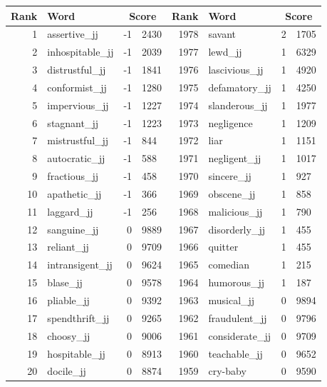 \begin{table}[tbp]
    \begin{tabular}{| rlr@{.}l | rlr@{.}l |}
    \hline
    \textbf{Rank} & \textbf{Word} & \multicolumn{2}{c|}{\textbf{Score}} & \textbf{Rank} & \textbf{Word} & \multicolumn{2}{c|}{\textbf{Score}} \\
    \hline
    1 & assertive\_jj & -1 & 2430    &    1978 & savant & 2 & 1705 \\
    2 & inhospitable\_jj & -1 & 2039    &    1977 & lewd\_jj & 1 & 6329 \\
    3 & distrustful\_jj & -1 & 1841    &    1976 & lascivious\_jj & 1 & 4920 \\
    4 & conformist\_jj & -1 & 1280    &    1975 & defamatory\_jj & 1 & 4250 \\
    5 & impervious\_jj & -1 & 1227    &    1974 & slanderous\_jj & 1 & 1977 \\
    6 & stagnant\_jj & -1 & 1223    &    1973 & negligence & 1 & 1209 \\
    7 & mistrustful\_jj & -1 & 844    &    1972 & liar & 1 & 1151 \\
    8 & autocratic\_jj & -1 & 588    &    1971 & negligent\_jj & 1 & 1017 \\
    9 & fractious\_jj & -1 & 458    &    1970 & sincere\_jj & 1 & 927 \\
    10 & apathetic\_jj & -1 & 366    &    1969 & obscene\_jj & 1 & 858 \\
    11 & laggard\_jj & -1 & 256    &    1968 & malicious\_jj & 1 & 790 \\
    12 & sanguine\_jj & 0 & 9889    &    1967 & disorderly\_jj & 1 & 455 \\
    13 & reliant\_jj & 0 & 9709    &    1966 & quitter & 1 & 455 \\
    14 & intransigent\_jj & 0 & 9624    &    1965 & comedian & 1 & 215 \\
    15 & blase\_jj & 0 & 9578    &    1964 & humorous\_jj & 1 & 187 \\
    16 & pliable\_jj & 0 & 9392    &    1963 & musical\_jj & 0 & 9894 \\
    17 & spendthrift\_jj & 0 & 9265    &    1962 & fraudulent\_jj & 0 & 9796 \\
    18 & choosy\_jj & 0 & 9006    &    1961 & considerate\_jj & 0 & 9709 \\
    19 & hospitable\_jj & 0 & 8913    &    1960 & teachable\_jj & 0 & 9652 \\
    20 & docile\_jj & 0 & 8874    &    1959 & cry-baby & 0 & 9590 \\

\end{tabular}
\end{table}
